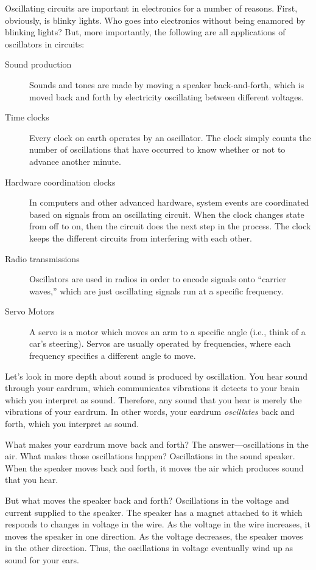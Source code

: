 Oscillating circuits are important in electronics for a number of reasons.
First, obviously, is blinky lights.  
Who goes into electronics without being enamored by blinking lights?
But, more importantly, the following are all applications of oscillators in circuits:
\begin{description}
\item[Sound production] Sounds and tones are made by moving a speaker back-and-forth, which is moved back and forth by electricity oscillating between different voltages.
\item[Time clocks] Every clock on earth operates by an oscillator.  The clock simply counts the number of oscillations that have occurred to know whether or not to advance another minute.
\item[Hardware coordination clocks] In computers and other advanced hardware, system events are coordinated based on signals from an oscillating circuit.  When the clock changes state from off to on, then the circuit does the next step in the process.  The clock keeps the different circuits from interfering with each other.
\item[Radio transmissions] Oscillators are used in radios in order to encode signals onto ``carrier waves,'' which are just oscillating signals run at a specific frequency.
\item[Servo Motors] A servo is a motor which moves an arm to a specific angle (i.e., think of a car's steering).  Servos are usually operated by frequencies, where each frequency specifies a different angle to move.
\end{description}

Let's look in more depth about sound is produced by oscillation.
You hear sound through your eardrum, which communicates vibrations it detects to your brain which you interpret as sound.
Therefore, any sound that you hear is merely the vibrations of your eardrum.
In other words, your eardrum \emph{oscillates} back and forth, which you interpret as sound.

What makes your eardrum move back and forth?
The answer---oscillations in the air.
What makes those oscillations happen?
Oscillations in the sound speaker.
When the speaker moves back and forth, it moves the air which produces sound that you hear.

But what moves the speaker back and forth?
Oscillations in the voltage and current supplied to the speaker.
The speaker has a magnet attached to it which responds to changes in voltage in the wire.
As the voltage in the wire increases, it moves the speaker in one direction.
As the voltage decreases, the speaker moves in the other direction.
Thus, the oscillations in voltage eventually wind up as sound for your ears.

